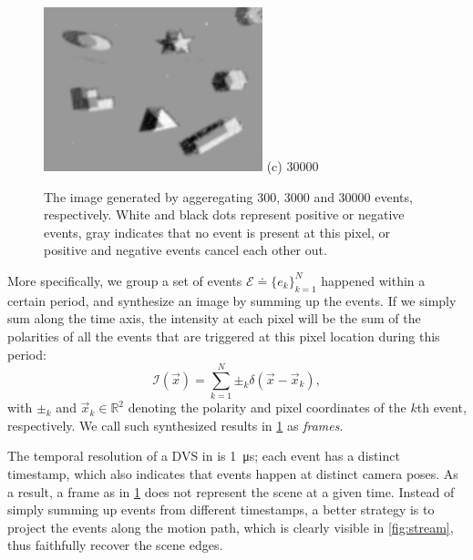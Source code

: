 \begin{figure}[h]
\begin{minipage}[t]{0.3\textwidth}
    \centering \includegraphics[width = \textwidth]{images/30000.jpg}
    (c) \num{30000}
  \end{minipage}
  \caption{The image generated by aggeregating \num{300}, \num{3000}
    and \num{30000} events, respectively. White and black dots
    represent positive or negative events, gray indicates that no
    event is present at this pixel, or positive and negative events
    cancel each other out.}
  \label{fig:window_size_3}
\end{figure}
More specifically, we group a set of events
$\mathscr{E}\doteq \{e_k\}_{k=1}^N$ happened within a certain period,
and synthesize an image by summing up the events. If we simply sum
along the time axis, the intensity at each pixel will be the sum of
the polarities of all the events that are triggered at this pixel
location during this period:
\begin{equation}
  \label{eq:intensity}
  \mathcal{I}(\vec{x}) = \sum_{k=1}^N\pm_k\delta(\vec{x}-\vec{x}_k),
\end{equation}
with $\pm_k$ and $\vec{x}_k\in\mathbb{R}^2$ denoting the polarity and
pixel coordinates of the $k$th event, respectively. We call such
synthesized results in \cref{fig:window_size_3} as \emph{frames}.

The temporal resolution of a DVS in \citep{brandli2014240} is
\SI{1}{\micro s}; each event has a distinct timestamp, which also
indicates that events happen at distinct camera poses. As a result, a
frame as in \cref{fig:window_size_3} does not represent the scene at a
given time. Instead of simply summing up events from different
timestamps, a better strategy is to project the events along the
motion path, which is clearly visible in \cref{fig:stream}, thus
faithfully recover the scene edges.

